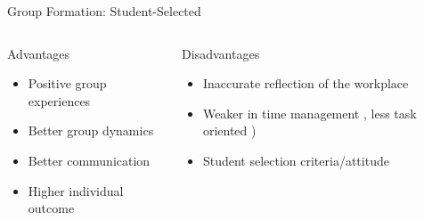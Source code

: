 \begin{frame}{Group Formation: Student-Selected}
 \fontsize{10.5pt}{12}\selectfont

\begin{columns}
    \begin{column}[T, onlytextwidth]{.45\textwidth}
        \begin{alertblock}{Advantages}
            \begin{itemize}
                \item Positive group experiences \cite{chapman2006, hilton2010}
                \item Better group dynamics \cite{chapman2006, hilton2010}
                \item Better communication \cite{pociask2017}
                \item Higher individual outcome \cite{hilton2010}
            \end{itemize}
        \end{alertblock}
    \end{column}
            
    \begin{column}[T, onlytextwidth]{.45\textwidth}
        \begin{alertblock}{Disadvantages}
            \begin{itemize}
                \item Inaccurate reflection of the workplace \cite{chapman2006}
                \item Weaker in time management \cite{chapman2006}, less task oriented \cite{hilton2010})
                \item Student selection criteria/attitude \cite{pociask2017}
            \end{itemize}
        \end{alertblock}
    \end{column}
\end{columns}
\end{frame}